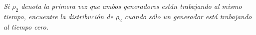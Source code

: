 \emph{
    Si $\rho_2$ denota la primera vez que ambos generadores est\'an trabajando al mismo tiempo, 
    encuentre la distribuci\'on de $\rho_2$ cuando s\'olo un generador est\'a trabajando al tiempo cero.\pn
}

\afterstatement\pn